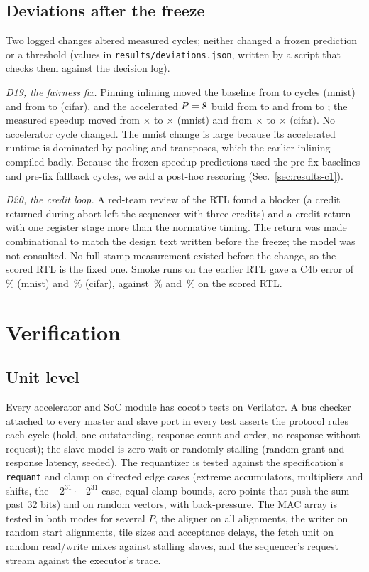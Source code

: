 \documentclass[journal]{IEEEtran}
\newcommand{\code}[1]{\texttt{#1}}
\begin{document}
\subsection{Deviations after the freeze}
Two logged changes altered measured cycles; neither changed a frozen prediction or a threshold (values in \texttt{results/deviations.json}, written by a script that checks them against the decision log).

\emph{D19, the fairness fix.} Pinning inlining moved the baseline from \DevBaseBeforeMnist{} to \BaselineCyclesMnist{} cycles (mnist) and from \DevBaseBeforeCifar{} to \BaselineCyclesCifar{} (cifar), and the accelerated $P=8$ build from \DevAccelBeforeMnist{} to \MeasCyclesMnistPeight{} and from \DevAccelBeforeCifar{} to \MeasCyclesCifarPeight{}; the measured speedup moved from \DevSpeedupBeforeMnist$\times$ to \DevSpeedupAfterMnist$\times$ (mnist) and from \DevSpeedupBeforeCifar$\times$ to \DevSpeedupAfterCifar$\times$ (cifar). No accelerator cycle changed. The mnist change is large because its accelerated runtime is dominated by pooling and transposes, which the earlier inlining compiled badly. Because the frozen speedup predictions used the pre-fix baselines and pre-fix fallback cycles, we add a post-hoc rescoring (Sec.~\ref{sec:results-c1}).

\emph{D20, the credit loop.} A red-team review of the RTL found a blocker (a credit returned during abort left the sequencer with three credits) and a credit return with one register stage more than the normative timing. The return was made combinational to match the design text written before the freeze; the model was not consulted. No full stamp measurement existed before the change, so the scored RTL is the fixed one. Smoke runs on the earlier RTL gave a C4b error of \DevCfourBErrBeforeMnist\,\% (mnist) and \DevCfourBErrBeforeCifar\,\% (cifar), against \DevCfourBErrAfterMnist\,\% and \DevCfourBErrAfterCifar\,\% on the scored RTL.

\section{Verification}\label{sec:verif}
\subsection{Unit level}
Every accelerator and SoC module has cocotb tests on Verilator. A bus checker attached to every master and slave port in every test asserts the protocol rules each cycle (hold, one outstanding, response count and order, no response without request); the slave model is zero-wait or randomly stalling (random grant and response latency, seeded). The requantizer is tested against the specification's \code{requant} and clamp on directed edge cases (extreme accumulators, multipliers and shifts, the $-2^{31}\cdot-2^{31}$ case, equal clamp bounds, zero points that push the sum past 32 bits) and on random vectors, with back-pressure. The MAC array is tested in both modes for several $P$, the aligner on all alignments, the writer on random start alignments, tile sizes and acceptance delays, the fetch unit on random read/write mixes against stalling slaves, and the sequencer's request stream against the executor's trace.
\end{document}

